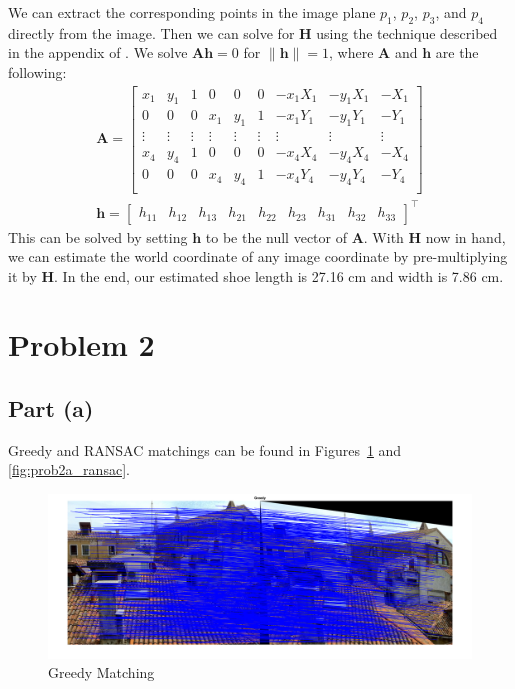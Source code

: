 \documentclass[12pt]{article}
\begin{document}
%
We can extract the corresponding points in the image plane $p_1$, $p_2$, $p_3$,
and $p_4$ directly from the image. Then we can solve for $\mathbf{H}$ using
the technique described in the appendix of \citep{criminisi2002single}. We
solve $\mathbf{A}\mathbf{h} = 0$ for $\|\mathbf{h}\|=1$, where $\mathbf{A}$
and $\mathbf{h}$ are the following:
%
\begin{align}
    \mathbf{A} = \begin{bmatrix}
        x_1 & y_1 & 1 & 0   & 0   & 0 & -x_1 X_1 & -y_1 X_1 & -X_1 \\
        0   & 0   & 0 & x_1 & y_1 & 1 & -x_1 Y_1 & -y_1 Y_1 & -Y_1 \\
        \vdots & \vdots & \vdots & \vdots & \vdots &
        \vdots & \vdots & \vdots & \vdots \\
        x_4 & y_4 & 1 & 0   & 0   & 0 & -x_4 X_4 & -y_4 X_4 & -X_4 \\
        0   & 0   & 0 & x_4 & y_4 & 1 & -x_4 Y_4 & -y_4 Y_4 & -Y_4 \\
    \end{bmatrix} \\
    \mathbf{h} = \begin{bmatrix}
        h_{11} & h_{12} & h_{13} &
        h_{21} & h_{22} & h_{23} &
        h_{31} & h_{32} & h_{33}
    \end{bmatrix}^\top
\end{align}
%
This can be solved by setting $\mathbf{h}$ to be the null vector of
$\mathbf{A}$. With $\mathbf{H}$ now in hand, we can estimate the world
coordinate of any image coordinate by pre-multiplying it by $\mathbf{H}$.
In the end, our estimated shoe length is 27.16 cm and width is 7.86 cm.

% 

\section*{Problem 2}

\subsection*{Part (a)}

Greedy and RANSAC matchings can be found in Figures~\ref{fig:prob2a_greedy} and
\ref{fig:prob2a_ransac}.

\begin{figure}[ht]
    \includegraphics[width=\linewidth]{output/prob2a_output_greedy.png}
    \caption{Greedy Matching}
    \label{fig:prob2a_greedy}
\end{figure}
\end{document}
